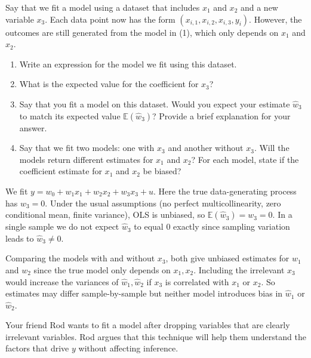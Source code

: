 \documentclass{article}
\newcommand{\E}{\mathbb{E}}
\begin{document}
\begin{probset}
\begin{prob} 
\begin{subprobset}
        \newpage

        \begin{subprob}
            Say that we fit a model using a dataset that includes $x_1$ and $x_2$ and a new variable $x_3$. Each data point now has the form $(x_{i,1}, x_{i,2}, x_{i,3}, y_i)$. However, the outcomes are still generated from the model in (1), which only depends on $x_1$ and $x_2$.

            \begin{enumerate}[label=\roman*.]
                \item Write an expression for the model we fit using this dataset.
                \item What is the expected value for the coefficient for $x_3$?
                \item Say that you fit a model on this dataset. Would you expect your estimate $\hat{w}_3$ to match its expected value $\E(\hat{w}_3)$? Provide a brief explanation for your answer.
                \item Say that we fit two models: one with $x_3$ and another without $x_3$. Will the models return different estimates for $x_1$ and $x_2$? For each model, state if the coefficient estimate for $x_1$ and $x_2$ be biased?
            \end{enumerate}

            \begin{soln}
                We fit $y = w_0 + w_1 x_1 + w_2 x_2 + w_3 x_3 + u$.
                Here the true data-generating process has $w_3 = 0$. Under the usual assumptions (no perfect multicollinearity, zero conditional mean, finite variance), OLS is unbiased, so $\E(\hat w_3) = w_3 = 0$. In a single sample we do not expect $\hat w_3$ to equal 0 exactly since sampling variation leads to $\hat w_3 \neq 0$.
                
                Comparing the models with and without $x_3$, both give unbiased estimates for $w_1$ and $w_2$ since the true model only depends on $x_1, x_2$. Including the irrelevant $x_3$ would increase the variances of $\hat w_1, \hat w_2$ if $x_3$ is correlated with $x_1$ or $x_2$. So estimates may differ sample-by-sample but neither model introduces bias in $\hat w_1$ or $\hat w_2$.
            \end{soln}
        \end{subprob}

        \begin{subprob}
            Your friend Rod wants to fit a model after dropping variables that are clearly irrelevant variables. Rod argues that this technique will help them understand the factors that drive $y$ without affecting inference.


\end{subprob}
\end{subprobset}
\end{prob}
\end{probset}
\end{document}
